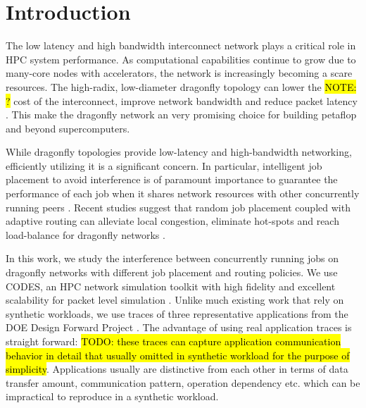 \documentclass[conference,compsoc]{IEEEtran}
\newcommand{\TODO}[1]{\hl{TODO: #1}}
\newcommand{\NOTE}[1]{\hl {NOTE: #1}}
\begin{document}




%
\IEEEpeerreviewmaketitle



\section{Introduction}
\label{sec:intro}

The low latency and high bandwidth interconnect network plays a critical role in HPC system performance. As computational capabilities continue to grow due to many-core nodes with accelerators, the network is increasingly becoming a scare resources. The high-radix, low-diameter dragonfly topology can lower the \NOTE{?} cost of the interconnect, improve network bandwidth and reduce packet latency \cite{dally-dragonfly}. This make the dragonfly network an very promising choice for building petaflop and beyond supercomputers. 


While dragonfly topologies provide low-latency and high-bandwidth networking, efficiently utilizing it is a significant concern. In particular, intelligent job placement to avoid interference is of paramount importance to guarantee the performance of each job when it shares network resources with other concurrently running peers \cite{bhatele2015, dskinner}. Recent studies suggest that random job placement coupled with adaptive routing can alleviate local congestion, eliminate hot-spots and reach load-balance for dragonfly networks \cite{jain-sc14, bhatele-sc11, brandt2014}. 


In this work, we study the interference between concurrently running jobs on dragonfly networks with different job placement and routing policies. We use CODES, an HPC network simulation toolkit with high fidelity and excellent scalability for packet level simulation \cite{codes}. Unlike much existing work that rely on synthetic workloads, we use traces of three representative applications from the DOE Design Forward Project \cite{designforwardwebpage}. The advantage of using real application traces is straight forward: \TODO{ these traces can capture application communication behavior in detail that usually omitted in synthetic workload for the purpose of simplicity}. Applications usually are distinctive from each other in terms of data transfer amount, communication pattern, operation dependency etc. which can be impractical to reproduce in a synthetic workload.
\end{document}
